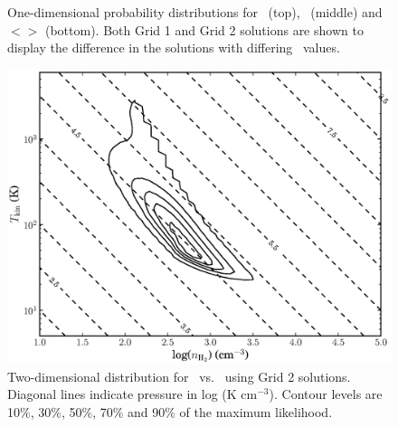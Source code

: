 \begin{figure}[h]
\caption[distrib]{One-dimensional probability distributions for \tkin\ (top), \nhtwo\ (middle) and $<$\nco$>$ (bottom). Both Grid 1 and Grid 2 solutions are shown to display the difference in the solutions with differing \xco\ values. }
\label{}
\end{figure}

\begin{figure}[h] %
\centering
\includegraphics[scale=0.8]{Chapter-2/Figures/fig6_contour.eps} 
\caption[contours]{Two-dimensional distribution for \tkin\ vs. \nhtwo\ using Grid 2 solutions. Diagonal lines indicate pressure in log (K cm$^{-3}$). Contour levels are 10$\%$, 30$\%$, 50$\%$, 70$\%$ and 90$\%$ of the maximum likelihood.}
\label{}
\end{figure}



